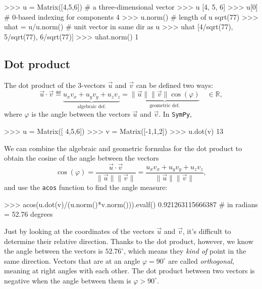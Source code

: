\small
\begin{verbatimtab}
>>> u = Matrix([4,5,6])   # a three-dimensional vector
>>> u
[4, 5, 6]
>>> u[0]                  # 0-based indexing for components 
4
>>> u.norm()              # length of u 
sqrt(77)
>>> uhat = u/u.norm()     # unit vector in same dir as u
>>> uhat
[4/sqrt(77), 5/sqrt(77), 6/sqrt(77)]
>>> uhat.norm()
1
\end{verbatimtab}
\normalsize




\subsection{Dot product}
\label{vectors:dot_product}

The dot product of the $3$-vectors $\vec{u}$ and $\vec{v}$ can be defined two ways:						
\[
  \vec{u}\cdot\vec{v}
  	\eqdef 
	\underbrace{u_xv_x+u_yv_y+u_zv_z}_{\textrm{algebraic def.}} 
	=
	\underbrace{\|\vec{u}\|\|\vec{v}\|\cos(\varphi)}_{\textrm{geometric def.}} 
	\quad \in \mathbb{R},
\]
where $\varphi$ is the angle between the vectors $\vec{u}$ and $\vec{v}$.
In \texttt{SymPy},

\small
\begin{verbatimtab}
>>> u = Matrix([ 4,5,6])
>>> v = Matrix([-1,1,2])
>>> u.dot(v)
13
\end{verbatimtab}
\normalsize

\noindent
We can combine the algebraic and geometric formulas for the dot product
to obtain the cosine of the angle between the vectors
\[
    \cos(\varphi)
        = \frac{ \vec{u}\cdot\vec{v} }{  \|\vec{u}\|\|\vec{v}\| }
        = \frac{ u_xv_x+u_yv_y+u_zv_z  }{  \|\vec{u}\|\|\vec{v}\| },
\]
and use the \texttt{acos} function to find the angle measure:

\small
\begin{verbatimtab}
>>> acos(u.dot(v)/(u.norm()*v.norm())).evalf()
0.921263115666387      # in radians  =  52.76 degrees
\end{verbatimtab}
\normalsize

\noindent
Just by looking at the coordinates of the vectors $\vec{u}$ and $\vec{v}$,
it's difficult to determine their relative direction. 
Thanks to the dot product, however,
we know the angle between the vectors is $52.76^\circ$,
which means they \emph{kind of} point in the same direction.
Vectors that are at an angle $\varphi=90^\circ$ are called \emph{orthogonal}, meaning at right angles with each other.
The dot product between two vectors is negative when the angle between them is $\varphi > 90^\circ$.

